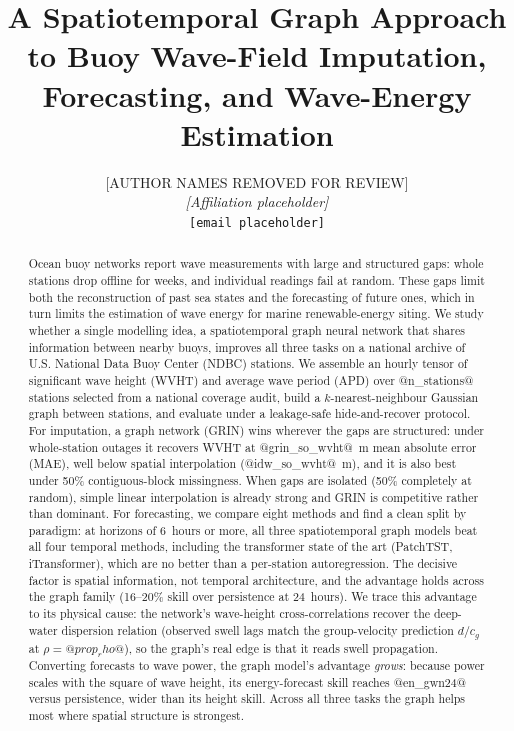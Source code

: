 \documentclass[11pt]{article}
\title{\bfseries A Spatiotemporal Graph Approach to Buoy Wave-Field
Imputation, Forecasting, and Wave-Energy Estimation}
\author{%
[AUTHOR NAMES REMOVED FOR REVIEW]\\
\textit{[Affiliation placeholder]}\\
\texttt{[email placeholder]}}
\date{}
\begin{document}
\maketitle

\begin{abstract}
\noindent
Ocean buoy networks report wave measurements with large and structured gaps:
whole stations drop offline for weeks, and individual readings fail at random.
These gaps limit both the reconstruction of past sea states and the forecasting
of future ones, which in turn limits the estimation of wave energy for marine
renewable-energy siting. We study whether a single modelling idea, a
spatiotemporal graph neural network that shares information between nearby
buoys, improves all three tasks on a national archive of U.S. National Data
Buoy Center (NDBC) stations. We assemble an hourly tensor of significant wave
height (WVHT) and average wave period (APD) over @n_stations@ stations selected
from a national coverage audit, build a $k$-nearest-neighbour Gaussian graph
between stations, and evaluate under a leakage-safe hide-and-recover protocol.
For imputation, a graph network (GRIN) wins wherever the gaps are structured:
under whole-station outages it recovers WVHT at @grin_so_wvht@~m mean absolute
error (MAE), well below spatial interpolation (@idw_so_wvht@~m), and it is also
best under 50\% contiguous-block missingness. When gaps are isolated
(50\% completely at random), simple linear interpolation is already strong and
GRIN is competitive rather than dominant. For forecasting, we compare eight
methods and find a clean split by paradigm: at horizons of 6~hours or more, all
three spatiotemporal graph models beat all four temporal methods, including the
transformer state of the art (PatchTST, iTransformer), which are no better than a
per-station autoregression. The decisive factor is spatial information, not
temporal architecture, and the advantage holds across the graph family (16--20\%
skill over persistence at 24~hours). We trace this advantage to its physical cause:
the network's wave-height cross-correlations recover the deep-water dispersion relation
(observed swell lags match the group-velocity prediction $d/c_g$ at
$\rho=@prop_rho@$), so the graph's real edge is that it reads swell propagation.
Converting forecasts to wave power, the graph model's advantage \emph{grows}:
because power scales with the square of wave height, its energy-forecast skill
reaches @en_gwn24@ versus persistence, wider than its height skill. Across all
three tasks the graph helps most where spatial structure is strongest.
\end{abstract}
\end{document}

